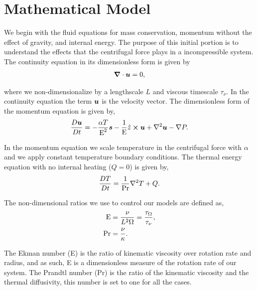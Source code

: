 \section{Mathematical Model}

We begin with the fluid equations for mass conservation, momentum without the effect of gravity, and internal energy. The purpose of this initial portion is to understand the effects that the centrifugal force plays in a incompressible system. The continuity equation in its dimensionless form is given by
\begin{align}
	\boldsymbol{\nabla} \cdot \boldsymbol{u} = 0,
\end{align}

where we non-dimensionalize by a lengthscale $L$ and viscous timescale $\tau_{\nu}$. In the continuity equation the term $\boldsymbol{u}$ is the velocity vector. The dimensionless form of the momentum equation is given by,
\begin{align}
	\frac{D \boldsymbol{u}}{D t} = -\frac{\alpha T}{\text{E}^2} \boldsymbol{s} - \frac{1}{\text{E}} \hat{z} \cross \boldsymbol{u} + \nabla^2 \boldsymbol{u} - \nabla P.
\end{align}

In the momentum equation we scale temperature in the centrifugal force with $\alpha$ and we apply constant temperature boundary conditions. The thermal energy equation with no internal heating ($Q=0$) is given by, 
\begin{align}
	\frac{D T}{D t} = \frac{1}{\text{Pr}} \nabla^2 T + Q.
\end{align}

The non-dimensional ratios we use to control our models are defined as, 
\begin{align}
	\text{E} &= \frac{\nu}{L^2 \Omega} = \frac{\tau_{\Omega}}{\tau_{\nu}}, \\
	\text{Pr} &= \frac{\nu}{\kappa}.
\end{align}

The Ekman number (E) is the ratio of kinematic viscosity over rotation rate and radius, and as such, E is a dimensionless measure of the rotation rate of our system. The Prandtl number (Pr) is the ratio of the kinematic viscosity and the thermal diffusivity, this number is set to one for all the cases. 
